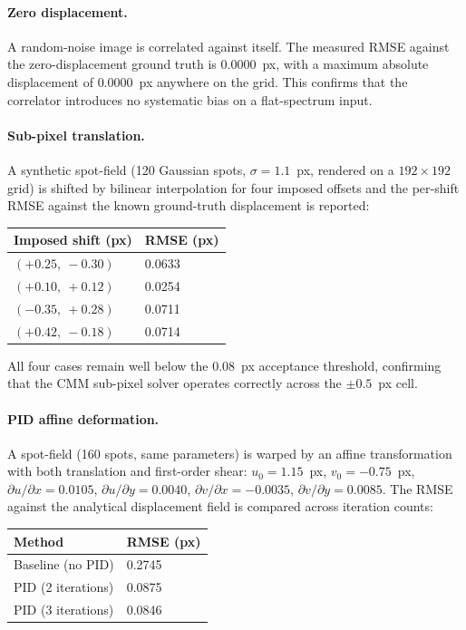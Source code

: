 \documentclass[11pt]{article}
\begin{document}
\paragraph{Zero displacement.}
A random-noise image is correlated against itself. The measured RMSE
against the zero-displacement ground truth is $0.0000$~px, with a
maximum absolute displacement of $0.0000$~px anywhere on the grid.
This confirms that the correlator introduces no systematic bias on a
flat-spectrum input.

\paragraph{Sub-pixel translation.}
A synthetic spot-field (120 Gaussian spots, $\sigma = 1.1$~px, rendered
on a $192 \times 192$ grid) is shifted by bilinear interpolation for four
imposed offsets and the per-shift RMSE against the known ground-truth
displacement is reported:

\begin{center}
\begin{tabular}{ll}
  \toprule
  \rowcolor{accentlight} Imposed shift (px) & RMSE (px) \\
  \midrule
  $(+0.25,\ -0.30)$ & 0.0633 \\
  $(+0.10,\ +0.12)$ & 0.0254 \\
  $(-0.35,\ +0.28)$ & 0.0711 \\
  $(+0.42,\ -0.18)$ & 0.0714 \\
  \bottomrule
\end{tabular}
\end{center}

All four cases remain well below the $0.08$~px acceptance threshold,
confirming that the CMM sub-pixel solver operates correctly across the
$\pm 0.5$~px cell.

\paragraph{PID affine deformation.}
A spot-field (160 spots, same parameters) is warped by an affine
transformation with both translation and first-order shear:
$u_0 = 1.15$~px, $v_0 = -0.75$~px, $\partial u/\partial x = 0.0105$,
$\partial u/\partial y = 0.0040$, $\partial v/\partial x = -0.0035$,
$\partial v/\partial y = 0.0085$. The RMSE against the analytical
displacement field is compared across iteration counts:

\begin{center}
\begin{tabular}{ll}
  \toprule
  \rowcolor{accentlight} Method & RMSE (px) \\
  \midrule
  Baseline (no PID) & 0.2745 \\
  PID (2 iterations) & 0.0875 \\
  PID (3 iterations) & 0.0846 \\
  \bottomrule
\end{tabular}
\end{center}
\end{document}
